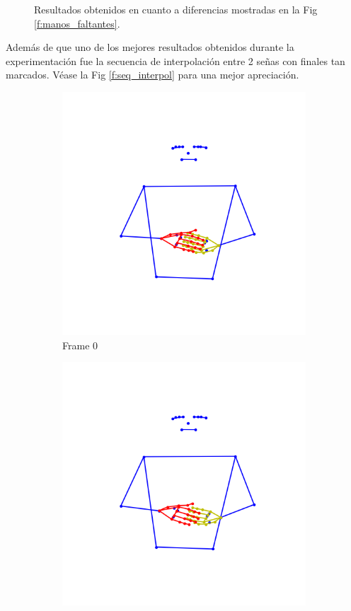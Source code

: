 \begin{figure}[t]
	
	\caption{Resultados obtenidos en cuanto a diferencias mostradas en la Fig \ref{f:manos_faltantes}.}
	\label{f:no_manos_faltantes}
	\end{figure}
	
Además de que uno de los mejores resultados obtenidos durante la experimentación fue la secuencia de interpolación entre 2 señas con finales tan marcados. Véase la Fig \ref{f:seq_interpol} para una mejor apreciación.
	\begin{figure}[t]
\centering
	\begin{subfigure}[t]{0.3\textwidth}
	\centering
		\includegraphics[align=t,width=0.9\linewidth, height =0.9\linewidth]{Graphics/interpol_aborto_amar_0.png}
		\caption{ Frame 0}
		\label{f:frame0}
	\end{subfigure}
	\begin{subfigure}[t]{0.3\textwidth}
	\centering
		\includegraphics[align=t,width=0.9\linewidth, height =0.9\linewidth]{Graphics/interpol_aborto_amar_1.png}

\end{subfigure}
\end{figure}

